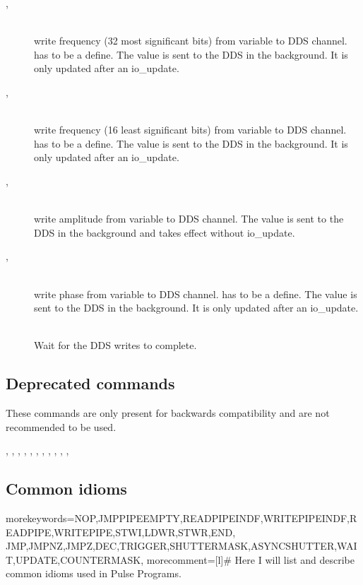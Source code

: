 \documentclass[11pt]{scrartcl}
\begin{document}
\begin{addmargin}{1cm}
\begin{description}
\item[ , ] \hfill\\ 
write frequency (32 most significant bits) from variable to DDS channel.  has to be a define. The value is sent to the DDS in the background. It is only updated after an io\_update. 

\item[ , ] \hfill\\ 
 write frequency (16 least significant bits) from variable to DDS channel.   has to be a define. The value is sent to the DDS in the background. It is only updated after an io\_update. 

\item[ , ] \hfill\\ 
 write amplitude from variable to DDS channel. The value is sent to the DDS in the background and takes effect without io\_update. 

\item[ , ] \hfill\\ 
write phase from variable to DDS channel.   has to be a define. The value is sent to the DDS in the background. It is only updated after an io\_update. 

\item[]\hfill\\
Wait for the DDS writes to complete.

\end{description}
\end{addmargin}

\subsection{Deprecated commands}
These commands are only present for backwards compatibility and are not recommended to be used.
\begin{addmargin}{1cm}
, , , , , , , , , , , 
\end{addmargin}

\subsection{Common idioms}
  { morekeywords={NOP,JMPPIPEEMPTY,READPIPEINDF,WRITEPIPEINDF,READPIPE,WRITEPIPE,STWI,LDWR,STWR,END,
    JMP,JMPNZ,JMPZ,DEC,TRIGGER,SHUTTERMASK,ASYNCSHUTTER,WAIT,UPDATE,COUNTERMASK},
 morecomment=[l]{\#}
}
Here I will list and describe common idioms used in Pulse Programs.
\end{document}
